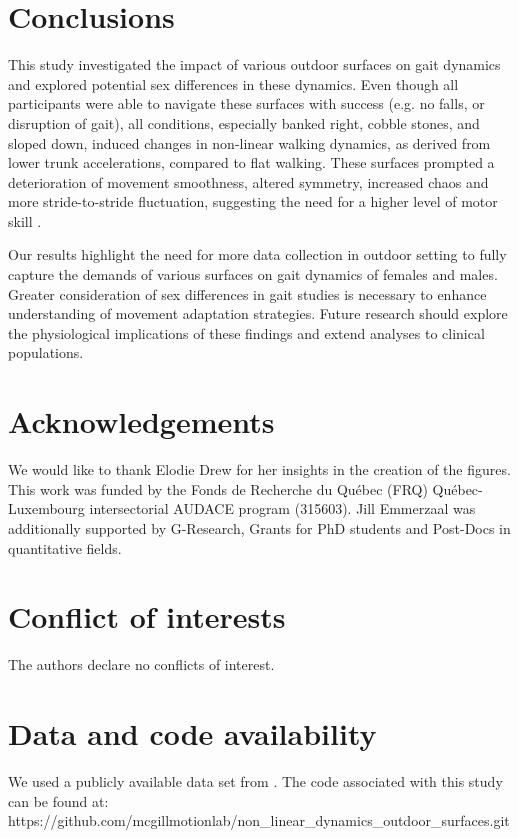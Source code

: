 \documentclass[authoryear,preprint,review,12pt]{elsarticle}
\begin{document}
\section{Conclusions} 
This study investigated the impact of various outdoor surfaces on gait dynamics and explored potential sex differences in these dynamics. 
Even though all participants were able to navigate these surfaces with success (e.g. no falls, or disruption of gait), all conditions, especially banked right, cobble stones, and sloped down, induced changes in non-linear walking dynamics, as derived from lower trunk accelerations, compared to flat walking. These surfaces prompted a deterioration of movement smoothness, altered symmetry, increased chaos and more stride-to-stride fluctuation, suggesting the need for a higher level of motor skill \citep{kiely_smoothness_2019, balasubramanian_analysis_2015, terrier2018maximum}.

Our results highlight the need for more data collection in outdoor setting to fully capture the demands of various surfaces on gait dynamics of females and males. Greater consideration of sex differences in gait studies is necessary to enhance understanding of movement adaptation strategies. Future research should explore the physiological implications of these findings and extend analyses to clinical populations.

\section*{Acknowledgements}
We would like to thank Elodie Drew for her insights in the creation of the figures. This work was funded by the Fonds de Recherche du Qu\'ebec (FRQ) Québec-Luxembourg intersectorial AUDACE program (315603). Jill Emmerzaal was additionally supported by G-Research, Grants for PhD students and Post-Docs in quantitative fields.

\section*{Conflict of interests}
The authors declare no conflicts of interest.

\section*{Data and code availability}
We used a publicly available data set from \citet{luo_database_2020}. The code associated with this study can be found at: \\
https://github.com/mcgillmotionlab/non\_linear\_dynamics\_outdoor\_surfaces.git


 

\end{document}
